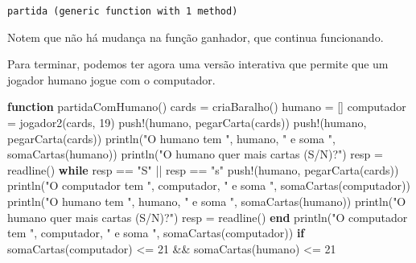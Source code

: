 \documentclass[
  letterpaper,
  DIV=11,
  numbers=noendperiod]{scrreprt}
\newenvironment{Shaded}{\begin{snugshade}}{\end{snugshade}}
\newcommand{\ControlFlowTok}[1]{\textcolor[rgb]{0.00,0.23,0.31}{\textbf{#1}}}
\newcommand{\FloatTok}[1]{\textcolor[rgb]{0.68,0.00,0.00}{#1}}
\newcommand{\FunctionTok}[1]{\textcolor[rgb]{0.28,0.35,0.67}{#1}}
\newcommand{\KeywordTok}[1]{\textcolor[rgb]{0.00,0.23,0.31}{\textbf{#1}}}
\newcommand{\NormalTok}[1]{\textcolor[rgb]{0.00,0.23,0.31}{#1}}
\newcommand{\OperatorTok}[1]{\textcolor[rgb]{0.37,0.37,0.37}{#1}}
\newcommand{\StringTok}[1]{\textcolor[rgb]{0.13,0.47,0.30}{#1}}
\begin{document}
\begin{verbatim}
partida (generic function with 1 method)
\end{verbatim}

Notem que não há mudança na função ganhador, que continua funcionando.

Para terminar, podemos ter agora uma versão interativa que permite que
um jogador humano jogue com o computador.

\begin{Shaded}
\begin{Highlighting}[]
\KeywordTok{function} \FunctionTok{partidaComHumano}\NormalTok{()}
\NormalTok{    cards }\OperatorTok{=} \FunctionTok{criaBaralho}\NormalTok{()}
\NormalTok{    humano }\OperatorTok{=}\NormalTok{ []}
\NormalTok{    computador }\OperatorTok{=} \FunctionTok{jogador2}\NormalTok{(cards, }\FloatTok{19}\NormalTok{)}
    \FunctionTok{push!}\NormalTok{(humano, }\FunctionTok{pegarCarta}\NormalTok{(cards))}
    \FunctionTok{push!}\NormalTok{(humano, }\FunctionTok{pegarCarta}\NormalTok{(cards))}
    \FunctionTok{println}\NormalTok{(}\StringTok{"O humano tem "}\NormalTok{, humano, }\StringTok{" e soma "}\NormalTok{, }\FunctionTok{somaCartas}\NormalTok{(humano))}
    \FunctionTok{println}\NormalTok{(}\StringTok{"O humano quer mais cartas (S/N)?"}\NormalTok{)}
\NormalTok{    resp }\OperatorTok{=} \FunctionTok{readline}\NormalTok{()}
    \ControlFlowTok{while}\NormalTok{ resp }\OperatorTok{==} \StringTok{"S"} \OperatorTok{||}\NormalTok{ resp }\OperatorTok{==} \StringTok{"s"}
         \FunctionTok{push!}\NormalTok{(humano, }\FunctionTok{pegarCarta}\NormalTok{(cards))}
         \FunctionTok{println}\NormalTok{(}\StringTok{"O computador tem "}\NormalTok{, computador, }\StringTok{" e soma "}\NormalTok{, }\FunctionTok{somaCartas}\NormalTok{(computador))}
         \FunctionTok{println}\NormalTok{(}\StringTok{"O humano tem "}\NormalTok{, humano, }\StringTok{" e soma "}\NormalTok{, }\FunctionTok{somaCartas}\NormalTok{(humano))}
         \FunctionTok{println}\NormalTok{(}\StringTok{"O humano quer mais cartas (S/N)?"}\NormalTok{)}
\NormalTok{         resp }\OperatorTok{=} \FunctionTok{readline}\NormalTok{()}
    \ControlFlowTok{end}
    \FunctionTok{println}\NormalTok{(}\StringTok{"O computador tem "}\NormalTok{, computador, }\StringTok{" e soma "}\NormalTok{, }\FunctionTok{somaCartas}\NormalTok{(computador))}
    \ControlFlowTok{if} \FunctionTok{somaCartas}\NormalTok{(computador) }\OperatorTok{\textless{}=} \FloatTok{21} \OperatorTok{\&\&} \FunctionTok{somaCartas}\NormalTok{(humano) }\OperatorTok{\textless{}=} \FloatTok{21}

\end{Highlighting}
\end{Shaded}
\end{document}
